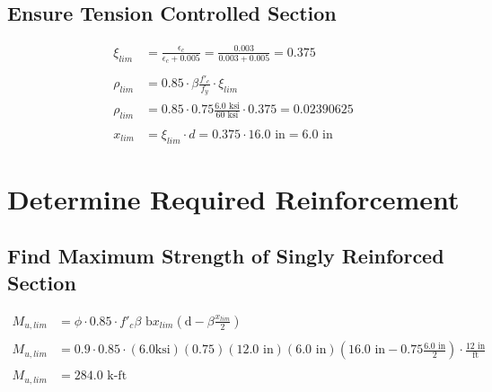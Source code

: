 \documentclass{article}%
\begin{document}
%
\subsection{Ensure Tension Controlled Section}%
\label{subsec:Ensure Tension Controlled Section}%
\begin{align*} \xi_{lim} &= \frac{\epsilon_c}{\epsilon_c + 0.005} = \frac{0.003}{0.003 + 0.005} = 0.375 \\\\ \rho_{lim} &= 0.85 \cdot \beta \frac{f'_c}{f_y} \cdot \xi_{lim} \\ \rho_{lim} &= 0.85 \cdot 0.75 \frac{6.0 \text{ ksi}}{60 \text{ ksi}} \cdot 0.375 = 0.02390625 \\\\ x_{lim} &= \xi_{lim} \cdot d = 0.375 \cdot 16.0 \text{ in} = 6.0 \text{ in}\end{align*}

%
\newpage%
\section{Determine Required Reinforcement}%
\label{sec:Determine Required Reinforcement}%
\subsection{Find Maximum Strength of Singly Reinforced Section}%
\label{subsec:Find Maximum Strength of Singly Reinforced Section}%
\begin{align*}M_{u, lim} &= \phi \cdot 0.85 \cdot f'_c \beta \text{ b} x_{lim}\left(\text{d} - \beta \frac{x_{lim}}{2}\right) \\\\M_{u, lim} &= 0.9 \cdot 0.85 \cdot (6.0 \text{ksi})(0.75)(12.0 \text{ in})(6.0 \text{ in})\left(16.0 \text{ in} - 0.75 \frac{6.0 \text{ in}}{2}\right) \cdot \frac{12 \text{ in}}{\text{ft}}\\\\M_{u, lim} &= 284.0 \text { k-ft}\end{align*}

%
\end{document}
